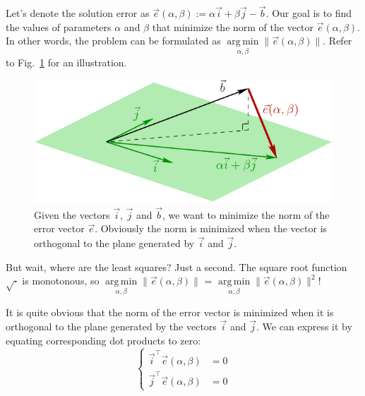 \documentclass[notitlepage,oneside]{book}
\DeclareMathOperator*{\argmin}{arg\,min}
\begin{document}
Let's denote the solution error as $\vec{e}(\alpha, \beta) :=  \alpha \vec{i} + \beta\vec{j} - \vec b$.
Our goal is to find the values of parameters $\alpha$ and $\beta$ that minimize the norm of the vector $\vec{e}(\alpha, \beta)$. 
In other words, the problem can be formulated as $\argmin\limits_{\alpha, \beta} \|\vec{e}(\alpha, \beta)\|$.
Refer to Fig.~\ref{fig:error} for an illustration.

\begin{figure}[ht]
	\centering
	\includegraphics[width=.7\linewidth]{img/error.pdf}
	\caption{Given the vectors $\vec i$, $\vec j$ and $\vec b$, we want to minimize the norm of the error vector $\vec e$. 
    Obviously the norm is minimized when the vector is orthogonal to the plane generated by $\vec i$ and $\vec j$.}
	\label{fig:error}
\end{figure}

But wait, where are the least squares? Just a second. The square root function $\sqrt{\cdot}$ is monotonous, so $\argmin\limits_{\alpha, \beta} \|\vec{e}(\alpha, \beta)\|$ = $\argmin\limits_{\alpha, \beta} \|\vec{e}(\alpha, \beta)\|^2$!

It is quite obvious that the norm of the error vector is minimized when it is orthogonal to the plane generated by the vectors $\vec i$ and $\vec j$.
We can express it by equating corresponding dot products to zero:
$$
\left\{
\begin{split}\vec{i}^\top \vec{e}(\alpha, \beta) &= 0\\
\vec{j}^\top \vec{e}(\alpha, \beta) &= 0
\end{split}
\right.
$$
\end{document}
